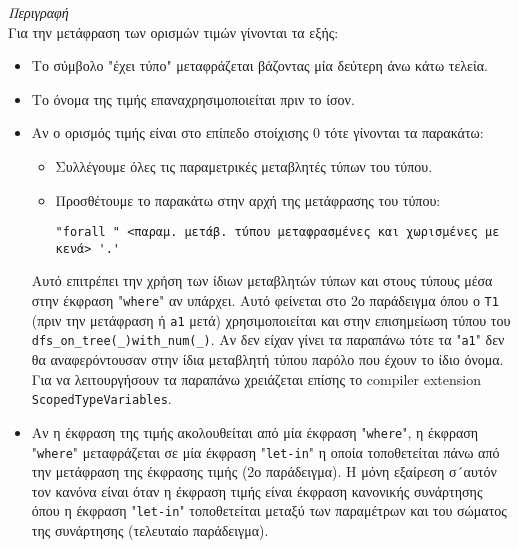 \documentclass[diploma]{softlab-thesis}
\begin{document}
\begin{itemize}
\textit{Περιγραφή}\\

Για την μετάφραση των ορισμών τιμών γίνονται τα εξής:

\begin{itemize}
\item
Το σύμβολο "έχει τύπο" μεταφράζεται βάζοντας μία δεύτερη άνω κάτω τελεία.

\item
Το όνομα της τιμής επαναχρησιμοποιείται πριν το ίσον.

\item
Αν ο ορισμός τιμής είναι στο επίπεδο στοίχισης 0 τότε γίνονται τα παρακάτω:

\begin{itemize}
\item
Συλλέγουμε όλες τις παραμετρικές μεταβλητές τύπων του τύπου.
\item
Προσθέτουμε το παρακάτω στην αρχή της μετάφρασης του τύπου:
\begin{verbatim}
"forall " <παραμ. μετάβ. τύπου μεταφρασμένες και χωρισμένες με κενά> '.'
\end{verbatim}
\end{itemize}

Αυτό επιτρέπει την χρήση των ίδιων μεταβλητών τύπων και στους τύπους μέσα στην
έκφραση "\texttt{where}" αν υπάρχει. Αυτό φείνεται στο 2ο παράδειγμα όπου ο
\texttt{T1} (πριν την μετάφραση ή \texttt{a1} μετά) χρησιμοποιείται και στην
επισημείωση τύπου του \\ \verb|dfs_on_tree(_)with_num(_)|.  Αν δεν είχαν γίνει
τα παραπάνω τότε τα "\texttt{a1}" δεν θα αναφερόντουσαν στην ίδια μεταβλητή
τύπου παρόλο που έχουν το ίδιο όνομα. Για να λειτουργήσουν τα παραπάνω
χρειάζεται επίσης το compiler extension \texttt{ScopedTypeVariables}.

\item
Αν η έκφραση της τιμής ακολουθείται από μία έκφραση "\texttt{where}", η έκφραση
"\texttt{where}" μεταφράζεται σε μία έκφραση "\texttt{let-in}" η οποία
τοποθετείται πάνω από την μετάφραση της έκφρασης τιμής (2ο παράδειγμα).  Η μόνη
εξαίρεση σ´αυτόν τον κανόνα είναι όταν η έκφραση τιμής είναι έκφραση κανονικής
συνάρτησης όπου η έκφραση "\texttt{let-in}" τοποθετείται μεταξύ των παραμέτρων
και του σώματος της συνάρτησης (τελευταίο παράδειγμα).

\end{itemize}

\end{itemize}

\newpage
\end{document}
